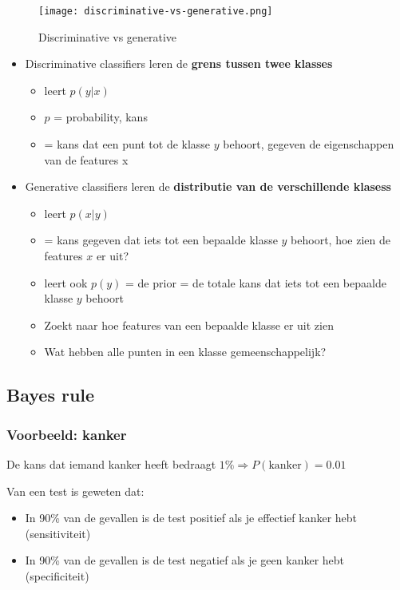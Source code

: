 \documentclass{article}
\begin{document}
\begin{figure}[H]
    \centering
    \texttt{[image: discriminative-vs-generative.png]}
    \caption{Discriminative vs generative}
\end{figure}

\begin{itemize}
    \item Discriminative classifiers leren de \textbf{grens tussen twee klasses}
    \begin{itemize}
        \item leert $p(y|x)$
        \item $p$ = probability, kans
        \item = kans dat een punt tot de klasse $y$ behoort, gegeven de eigenschappen van de features x
    \end{itemize}
    \item Generative classifiers leren de \textbf{distributie van de verschillende klasess}
    \begin{itemize}
        \item leert $p(x|y)$ 
        \item = kans gegeven dat iets tot een bepaalde klasse $y$ behoort, hoe zien de features $x$ er uit?
        \item leert ook $p(y)$ = de prior = de totale kans dat iets tot een bepaalde klasse $y$ behoort
        \item Zoekt naar hoe features van een bepaalde klasse er uit zien
        \item Wat hebben alle punten in een klasse gemeenschappelijk?
    \end{itemize}
\end{itemize}

\subsection{Bayes rule}

\subsubsection{Voorbeeld: kanker}

De kans dat iemand kanker heeft bedraagt $1\% \Rightarrow P(\text{kanker}) = 0.01$

Van een test is geweten dat:

\begin{itemize}
    \item In 90\% van de gevallen is de test positief als je effectief kanker hebt (sensitiviteit)
    \item In 90\% van de gevallen is de test negatief als je geen kanker hebt (specificiteit)
\end{itemize}
\end{document}
